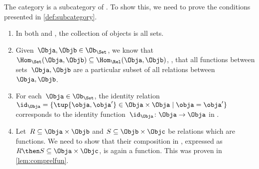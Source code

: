 \begin{example}
  The category \Set is a subcategory of \Rel. To show this, we need to prove the conditions presented in \cref{def:subcategory}.
  \begin{enumerate}
    \item In both \Rel and \Set, the collection of objects is all sets.
    \item Given~$\Obja,\Objb\in \Ob_{\Set}$, we know that~$\Hom_{\Set}(\Obja,\Objb)\subseteq \Hom_{\Rel}(\Obja,\Objb)$, \ie , that all functions between sets~$\Obja,\Objb$ are a particular subset of all relations between~$\Obja,\Objb$.
    \item For each~$\Obja \in \Ob_{\Set}$, the identity relation~$\id_\Obja=\{\tup{\obja,\obja'}\in \Obja\times \Obja \mid \obja=\obja'\}$ corresponds to the identity function~$\id_\Obja \colon \Obja \to \Obja$ in \Set.
    \item Let~$R\subseteq \Obja\times \Objb$ and $S\subseteq \Objb \times \Objc$ be relations which are functions. We need to show that their composition in \Rel, expressed as~$R\then S\subseteq \Obja\times \Objc$, is again a function. This was proven in \cref{lem:comprelfun}.
  \end{enumerate}

\end{example}

